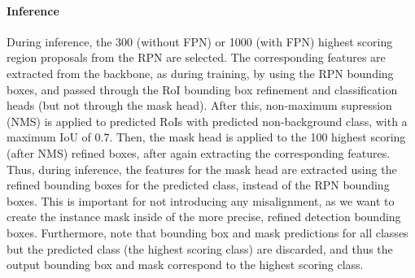 \paragraph{Inference}
During inference, the 300 (without FPN) or 1000 (with FPN) highest scoring region proposals
from the RPN are selected. The corresponding features are extracted from the backbone, as during training, by using the RPN bounding boxes,
and passed through the RoI bounding box refinement and classification heads
(but not through the mask head).
After this, non-maximum supression (NMS) is applied to predicted RoIs with predicted non-background class,
with a maximum IoU of 0.7.
Then, the mask head is applied to the 100 highest scoring (after NMS) refined boxes,
after again extracting the corresponding features.
Thus, during inference, the features for the mask head are extracted using the refined
bounding boxes for the predicted class, instead of the RPN bounding boxes. This is important for not
introducing any misalignment, as we want to create the instance mask inside of the
more precise, refined detection bounding boxes.
Furthermore, note that bounding box and mask predictions for all classes but the predicted
class (the highest scoring class) are discarded, and thus the output bounding
box and mask correspond to the highest scoring class.
